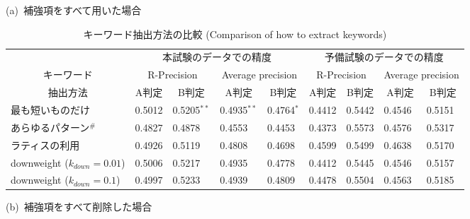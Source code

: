 \begin{table*}[t]
\footnotesize
  \caption{キーワード抽出方法の比較 (Comparison of how to extract keywords)}
  \label{tab:result_keyward}
  \begin{center}

\mbox{(a) 補強項をすべて用いた場合}

\begin{tabular}[c]{|@{ }l@{ }||l|l@{}|l@{}|l@{ }||l|l|l|l|}\hline
 & \multicolumn{4}{c||}{本試験のデータでの精度} & \multicolumn{4}{c|}{予備試験のデータでの精度} \\\cline{2-9}
\multicolumn{1}{|c||}{キーワード}  & \multicolumn{2}{c|}{R-Precision} & \multicolumn{2}{c||}{Average precision} & \multicolumn{2}{c|}{R-Precision} & \multicolumn{2}{c|}{Average precision} \\\cline{2-9}
\multicolumn{1}{|c||}{抽出方法} & \multicolumn{1}{c|}{A判定}  & \multicolumn{1}{c|}{B判定} & \multicolumn{1}{c|}{A判定}  & \multicolumn{1}{c||}{B判定} & \multicolumn{1}{c|}{A判定}  & \multicolumn{1}{c|}{B判定} & \multicolumn{1}{c|}{A判定}  & \multicolumn{1}{c|}{B判定}  \\\hline 
最も短いものだけ   & 0.5012  & 0.5205$^{**}$  & 0.4935$^{**}$  & 0.4764$^{*}$  & 0.4412  & 0.5442  & 0.4546  & 0.5151\\
あらゆるパターン$^{\#}$  & 0.4827 & 0.4878 & 0.4553 & 0.4453  & 0.4373  & 0.5573  & 0.4576  & 0.5317\\
ラティスの利用   & 0.4926 & 0.5119 & 0.4808 & 0.4698  & 0.4599  & 0.5499  & 0.4638  & 0.5170\\
downweight ($k_{down} = 0.01$) & 0.5006  & 0.5217  & 0.4935  & 0.4778  & 0.4412  & 0.5445  & 0.4546  & 0.5157\\
downweight ($k_{down} = 0.1$)  & 0.4997  & 0.5233  & 0.4939  & 0.4809  & 0.4478  & 0.5504  & 0.4563  & 0.5185\\\hline
\end{tabular}

\mbox{(b) 補強項をすべて削除した場合}


\end{center}
\end{table*}
